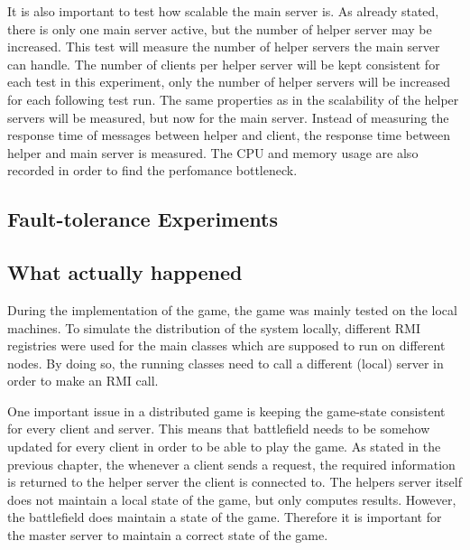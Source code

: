 It is also important to test how scalable the main server is. 
As already stated, there is only one main server active, but the number of helper server may be increased.
This test will measure  the number of helper servers the main server can handle.
The number of clients per helper server will be kept consistent for each test in this experiment, only the number of helper servers will be increased for each following test run.
The same properties as in the scalability of the helper servers will be measured, but now for the main server.
Instead of measuring the response time of messages between helper and client, the response time between helper and main server is measured.
The CPU and memory usage are also recorded in order to find the perfomance bottleneck.


\subsection{Fault-tolerance Experiments}

\subsection{What actually happened}
During the implementation of the game, the game was mainly tested on the local machines.
To simulate the distribution of the system locally, different RMI registries were used for the main classes which are supposed to run on different nodes.
By doing so, the running classes need to call a different (local) server in order to make an RMI call.

One important issue in a distributed game is keeping the game-state consistent for every client and server.
This means that battlefield needs to be somehow updated for every client in order to be able to play the game.
As stated in the previous chapter, the whenever a client sends a request, the required information is returned to the helper server the client is connected to.
The helpers server itself does not maintain a local state of the game, but only computes results.
However, the battlefield does maintain a state of the game. 
Therefore it is important for the master server to maintain a correct state of the game.